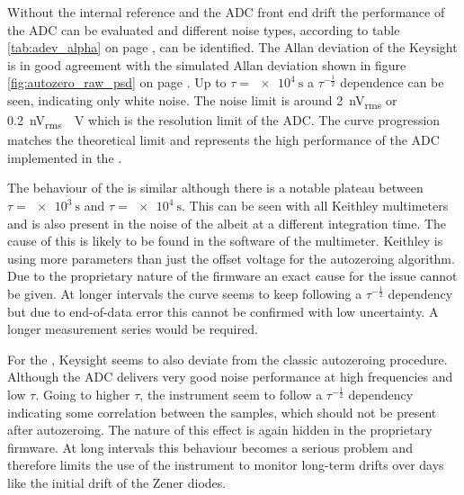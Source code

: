 Without the internal reference and the ADC front end drift the performance of the ADC can be evaluated and different noise types, according to table \ref{tab:adev_alpha} on page \pageref{tab:adev_alpha}, can be identified. The Allan deviation of the Keysight  is in good agreement with the simulated Allan deviation shown in figure \ref{fig:autozero_raw_psd} on page \pageref{fig:autozero_raw_psd}. Up to $\tau = \qty{e4}{\second}$ a $\tau^{-\frac{1}{2}}$ dependence can be seen, indicating only white noise. The noise limit is around \qty{2}{\nV_{rms}} or \qty{0.2}{\nV_{rms} \per \V} which is the resolution limit of the ADC. The  curve progression matches the theoretical limit and represents the high performance of the ADC implemented in the .

The behaviour of the  is similar although there is a notable plateau between $\tau = \qty{e3}{\second}$ and $\tau = \qty{e4}{\second}$. This can be seen with all Keithley multimeters and is also present in the noise of the  albeit at a different integration time. The cause of this is likely to be found in the software of the multimeter. Keithley is using more parameters than just the offset voltage for the autozeroing algorithm. Due to the proprietary nature of the firmware an exact cause for the issue cannot be given. At longer intervals the curve seems to keep following a $\tau^{-\frac{1}{2}}$ dependency but due to end-of-data error this cannot be confirmed with low uncertainty. A longer measurement series would be required.

For the , Keysight seems to also deviate from the classic autozeroing procedure. Although the ADC delivers very good noise performance at high frequencies and low $\tau$. Going to higher $\tau$, the instrument seem to follow a $\tau^{-\frac{1}{2}}$ dependency indicating some correlation between the samples, which should not be present after autozeroing. The nature of this effect is again hidden in the proprietary firmware. At long intervals this behaviour becomes a serious problem and therefore limits the use of the instrument to monitor long-term drifts over days like the initial drift of the  Zener diodes.

